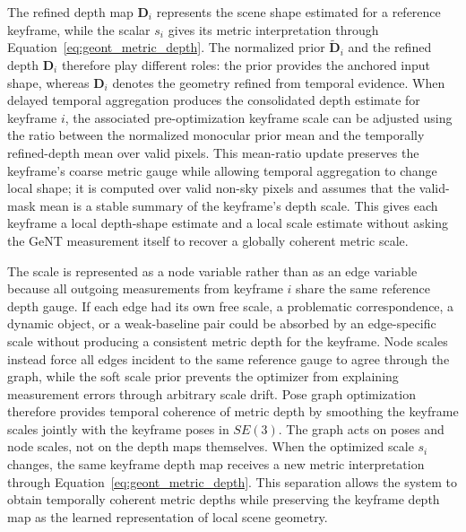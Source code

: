 The refined depth map $\bm{D}_i$ represents the scene shape estimated for a reference keyframe, while the scalar $s_i$ gives its metric interpretation through Equation~\ref{eq:geont_metric_depth}.
The normalized prior $\tilde{\bm{D}}_i$ and the refined depth $\bm{D}_i$ therefore play different roles: the prior provides the anchored input shape, whereas $\bm{D}_i$ denotes the geometry refined from temporal evidence.
When delayed temporal aggregation produces the consolidated depth estimate for keyframe $i$, the associated pre-optimization keyframe scale can be adjusted using the ratio between the normalized monocular prior mean and the temporally refined-depth mean over valid pixels.
This mean-ratio update preserves the keyframe's coarse metric gauge while allowing temporal aggregation to change local shape; it is computed over valid non-sky pixels and assumes that the valid-mask mean is a stable summary of the keyframe's depth scale.
This gives each keyframe a local depth-shape estimate and a local scale estimate without asking the GeNT measurement itself to recover a globally coherent metric scale.

The scale is represented as a node variable rather than as an edge variable because all outgoing measurements from keyframe $i$ share the same reference depth gauge.
If each edge had its own free scale, a problematic correspondence, a dynamic object, or a weak-baseline pair could be absorbed by an edge-specific scale without producing a consistent metric depth for the keyframe.
Node scales instead force all edges incident to the same reference gauge to agree through the graph, while the soft scale prior prevents the optimizer from explaining measurement errors through arbitrary scale drift.
Pose graph optimization therefore provides temporal coherence of metric depth by smoothing the keyframe scales jointly with the keyframe poses in $SE(3)$.
The graph acts on poses and node scales, not on the depth maps themselves.
When the optimized scale $s_i$ changes, the same keyframe depth map receives a new metric interpretation through Equation~\ref{eq:geont_metric_depth}.
This separation allows the system to obtain temporally coherent metric depths while preserving the keyframe depth map as the learned representation of local scene geometry.

